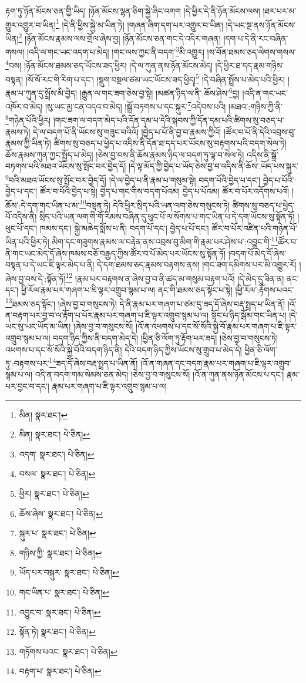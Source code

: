 རྟག་ཏུ་ཉོན་མོངས་ཅན་གྱི་ཡིད། །ཉོན་མོངས་ལྷན་ཅིག་སྐྱེ་ཞིང་འགག །དེ་ཕྱིར་དེ་ནི་ཉོན་མོངས་ལས། །ཐར་པར་མ་གྱུར་འགྱུར་བ་ཡིན།\footnote{མིན།  སྣར་ཐང་། } །དེ་ནི་ཕྱིས་སྐྱེ་མ་ཡིན་ཏེ། །གཞན་ཞིག་དག་པར་འགྱུར་བ་ཡིན། །དེ་ཡང་སྔ་ནས་ཉོན་མོངས་ཡིན།\footnote{མིན།  སྣར་ཐང་།  པེ་ཅིན། } །ཉོན་མོངས་རྣམས་ལས་གྲོལ་ཞེས་བྱ། །ཉོན་མོངས་ཅན་གང་དེ་འདིར་གཞན། །དག་པ་དེ་ནི་རང་བཞིན་གསལ། །འདི་ལ་གང་ཡང་འདག་པ་མེད། །གང་ལས་ཀྱང་ནི་བདག་\footnote{འདག་  སྣར་ཐང་།  པེ་ཅིན། }མི་འགྱུར། །ས་བོན་ཐམས་ཅད་ལེགས་གསལ་\footnote{བསལ་  སྣར་ཐང་།  པེ་ཅིན། }བས། །ཉོན་མོངས་ཐམས་ཅད་ཡོངས་ཟད་ཕྱིར། །དེ་ལ་ཀུན་ནས་ཉོན་མོངས་མེད། །དེ་ཕྱིར་ཐ་དད་རྣམ་གཉིས་བསྟན། །སོ་སོ་རང་གི་རིག་པ་དང་། །སྡུག་བསྔལ་ཙམ་ཡང་ཡོངས་ཟད་ཕྱིད།\footnote{ཕྱིར།  སྣར་ཐང་།  པེ་ཅིན། } །དེ་བཞིན་སྤྲོས་པ་མེད་པའི་ཕྱིར། །རྣམ་པ་ཀུན་དུ་སྤྲོས་མི་བྱེད། །རྒྱུན་ལ་གང་ཟག་ཅེས་བྱ་སྟེ། །མཚན་ཉིད་ལ་ནི་:ཆོས་ཤེས་\footnote{ཆོས་ཞེས་  སྣར་ཐང་།  པེ་ཅིན། }བྱ། །འདི་ན་གང་ཡང་འཁོར་བ་མེད། །སུ་ཡང་མྱ་ངན་འདའ་བ་མེད། །སྒྲོ་བཏགས་པ་དང་སྐུར་\footnote{སྐུར་པ་  སྣར་ཐང་།  པེ་ཅིན། }འདེབས་པའི། །མཐའ་:གཉིས་ཀྱི་ནི་\footnote{གཉིས་ཀྱི་  སྣར་ཐང་།  པེ་ཅིན། }གཉེན་པོའི་ཕྱིར། །གང་ཟག་ལ་བདག་མེད་པའི་དོན་དམ་པ་དེའི་སྐབས་ཀྱི་དོན་དམ་པའི་ཚིགས་སུ་བཅད་པ་རྣམས་ཏེ། དེ་ལ་བདག་པོ་ནི་ཡོངས་སུ་གཟུང་བའིའོ། །བྱེད་པ་པོ་ནི་བྱ་བ་རྣམས་ཀྱིའོ། །ཚོར་བ་པོ་ནི་དེའི་འབྲས་བུ་རྣམས་ཀྱི་ཡིན་ཏེ། ཚིགས་སུ་བཅད་པ་ཕྱེད་པ་འདིས་ནི་དོན་ཐ་དད་པར་ཡོངས་སུ་བརྟགས་པའི་བདག་སེལ་ཏེ། ཆོས་རྣམས་ཀུན་ཀྱང་སྤྱོད་པ་མེད། །ཅེས་བྱ་བས་ནི་ཆོས་རྣམས་ཉིད་ལ་བདག་ཏུ་ལྟ་བ་སེལ་ཏེ། འདིས་ནི་སྒྲོ་བཏགས་པའི་མཐའ་ཡོངས་སུ་སྤོང་བར་བྱེད་དོ། །དེ་ལྟ་མོད་ཀྱི་བྱེད་པ་ཡོད་ཅེས་བྱ་བ་འདིས་ནི་ཆོས་:ཡོད་པས་སྐུར་\footnote{ཡོད་པར་བསྐུར་  སྣར་ཐང་།  པེ་ཅིན། }བའི་མཐའ་ཡོངས་སུ་སྤོང་བར་བྱེད་དོ། །དེ་ལ་བྱེད་པ་ནི་རྣམ་པ་གསུམ་སྟེ། བདག་པོའི་བྱེད་པ་དང་། བྱེད་པ་པོའི་བྱེད་པ་དང་། ཚོར་བ་པོའི་བྱེད་པ་སྟེ། བྱེད་པ་གང་གིས་བདག་པོའམ། བྱེད་པ་པོའམ། ཚོར་བ་པོར་འདོགས་པའོ། །ཆོས་:དེ་དག་གང་ཡིན་པ་མ་\footnote{གང་ཡིན་པ་  སྣར་ཐང་།  པེ་ཅིན། }བསྟན་ཏེ། དེའི་ཕྱིར་སྲིད་པའི་ཡན་ལག་ཅེས་གསུངས་ཏེ། ཚིགས་སུ་བཅད་པ་ཕྱེད་པོ་འདིས་ནི། སྲིད་པའི་ཡན་ལག་གི་གོ་རིམས་བཞིན་དུ་ཕུང་པོ་ལ་སོགས་པ་གང་ཡིན་པ་དེ་དག་ཡོངས་སུ་སྟོན་ཏོ། །ཕུང་པོ་དང་། ཁམས་དང་། སྐྱེ་མཆེད་སྨོས་པ་ནི། བདག་པོ་དང་། བྱེད་པ་པོ་དང་། ཚོར་བ་པོར་འཛིན་པའི་གཉེན་པོ་ཡིན་པའི་ཕྱིར་ཏེ། མིག་དང་གཟུགས་རྣམས་ལ་བརྟེན་ནས་འབྲས་བུ་མིག་གི་རྣམ་པར་ཤེས་པ་:འབྱུང་གི་\footnote{འབྱུང་བ་  སྣར་ཐང་།  པེ་ཅིན། }ཚོར་བ་ནི་གང་ཡང་མེད་དོ་ཞེས་ཁམས་བཅོ་བརྒྱད་ཀྱིས་ཚོར་བ་པོ་མེད་པར་ཡོངས་སུ་སྟོན་ཏོ། །བདག་པོ་མེད་དོ་ཞེས་བསྟན་པ་དེ་ཡང་ཇི་ལྟར་མེད་པ་ནི། དེ་དག་ཐམས་ཅད་རྣམས་བརྟགས་ནས། །གང་ཟག་དམིགས་པར་མི་འགྱུར་རོ། །ཞེས་བྱ་བས་དེ་:སྟོན་ཏོ།\footnote{སྟོན་ཏེ།  སྣར་ཐང་།  པེ་ཅིན། } །རྣམ་པར་བརྟགས་ན་ཞེས་བྱ་བ་ནི་ཚད་མ་གསུམ་བརྟག་པའོ། །དེ་མེད་དུ་ཟིན་ན། ནང་དང་། ཕྱི་རོལ་རྣམ་པར་གཞག་པ་ཇི་ལྟར་འགྲུབ་སྙམ་པ་ལ། ནང་གི་ཐམས་ཅད་སྟོང་པ་སྟེ། །ཕྱི་རོལ་:རྟོགས་པའང་\footnote{གཏོགས་པའང་  སྣར་ཐང་།  པེ་ཅིན། }ཐམས་ཅད་སྟོང་། །ཞེས་བྱ་བ་གསུངས་ཏེ། དེ་ནི་རྣམ་པར་གཞག་པ་ཙམ་དུ་ཟད་དོ་ཞེས་བརྡ་སྤྲད་པ་ཡིན་ནོ། །འོ་ན་བརྟག་པར་བྱ་བ་ལ་རྟོག་པ་པོར་རྣམ་པར་གཞག་པ་ཇི་ལྟར་འགྲུབ་སྙམ་པ་ལ། སྟོང་པ་ཉིད་སྒོམ་གང་ཡིན་པ། །དེ་ཡང་སུ་ཡང་ཡོད་མ་ཡིན། །ཞེས་བྱ་བ་གསུངས་སོ། །འོ་ན་འཕགས་པ་དང་སོ་སོའི་སྐྱེ་བོ་རྣམ་པར་གཞག་པ་ཇི་ལྟར་འགྲུབ་སྙམ་པ་ལ། བདག་ཉིད་ཀྱིས་ནི་བདག་མེད་དེ། །ཕྱིན་ཅི་ལོག་ཏུ་རྟོག་པར་ཟད། །ཅེས་བྱ་བ་གསུངས་ཏེ། འཕགས་པ་དང་སོ་སོའི་སྐྱེ་བོའི་བདག་ཉིད་ནི། དེའི་བདག་ཉིད་ཀྱིས་ཡོངས་སུ་གྲུབ་པ་མེད་དེ། ཕྱིན་ཅི་ལོག་ཏུ་:བརྟགས་པར་\footnote{བརྟག་པ་  སྣར་ཐང་།  པེ་ཅིན། }ཟད་དོ་ཞེས་བརྡ་སྤྲད་པ་ཡིན་ནོ། །འོ་ན་གཞན་དང་བདག་རྣམ་པར་གཞག་པ་ཇི་ལྟར་འགྲུབ་སྙམ་པ་ལ། འདི་ན་བདག་གམ་སེམས་ཅན་མེད། །ཅེས་བྱ་བ་གསུངས་སོ། །འོ་ན་ཀུན་ནས་ཉོན་མོངས་པ་དང་། རྣམ་པར་བྱང་བ་དང་། རྣམ་པར་གཞག་པ་ཇི་ལྟར་འགྲུབ་སྙམ་པ་ལ། 